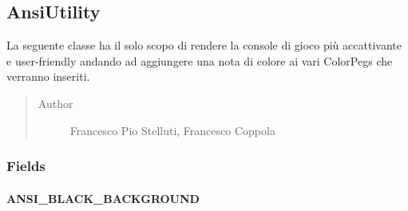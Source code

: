\documentclass[letterpaper,10pt,italian,openany,oneside]{sphinxmanual}
\begin{document}
\subsection{AnsiUtility}
\label{\detokenize{source/it/unicam/cs/pa/mastermind/ui/AnsiUtility:ansiutility}}\label{\detokenize{source/it/unicam/cs/pa/mastermind/ui/AnsiUtility::doc}}

\begin{fulllineitems}
\label{\detokenize{source/it/unicam/cs/pa/mastermind/ui/AnsiUtility:it.unicam.cs.pa.mastermind.ui.AnsiUtility}}
La seguente classe ha il solo scopo di rendere la console di gioco più accattivante e user-friendly andando ad aggiungere una nota di colore ai vari ColorPegs che verranno inseriti.
\begin{quote}\begin{description}
\item[{Author}] \leavevmode
Francesco Pio Stelluti, Francesco Coppola

\end{description}\end{quote}

\end{fulllineitems}



\subsubsection{Fields}
\label{\detokenize{source/it/unicam/cs/pa/mastermind/ui/AnsiUtility:fields}}

\paragraph{ANSI\_BLACK\_BACKGROUND}
\label{\detokenize{source/it/unicam/cs/pa/mastermind/ui/AnsiUtility:ansi-black-background}}

\begin{fulllineitems}
\label{\detokenize{source/it/unicam/cs/pa/mastermind/ui/AnsiUtility:it.unicam.cs.pa.mastermind.ui.AnsiUtility.ANSI_BLACK_BACKGROUND}}
\end{fulllineitems}
\end{document}
